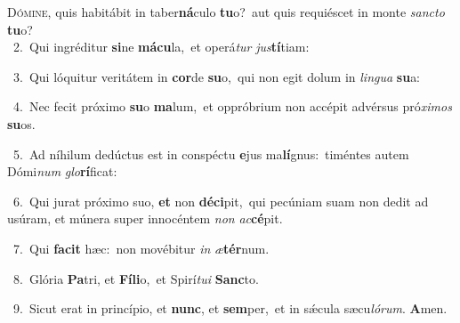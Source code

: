 \lettrine{\initial\textcolor{\initialcolor}{D}}{ómine,} quis habitábit in taber\-\textbf{ná}\-culo \textbf{tu}\-o?~\star aut quis requiéscet in monte \textit{sanc}\-\textit{to} \textbf{tu}\-o?\\
{\numbfont\textcolor{\numbcolor}{~2.}}~Qui ingréditur \textbf{si}\-ne \textbf{má}\-\textbf{cu}la,~\star et operá\textit{tur} \textit{jus}\-\textbf{tí}tiam:\par
{\numbfont\textcolor{\numbcolor}{~3.}}~Qui lóquitur veritátem in \textbf{cor}\-de \textbf{su}\-o,~\star qui non egit dolum in \textit{lin}\-\textit{gua} \textbf{su}\-a:\par
{\numbfont\textcolor{\numbcolor}{~4.}}~Nec fecit próximo \textbf{su}\-o \textbf{ma}\-lum,~\star et oppróbrium non accépit advérsus pró\-\textit{xi}\-\textit{mos} \textbf{su}\-os.\par
{\numbfont\textcolor{\numbcolor}{~5.}}~Ad níhilum dedúctus est in conspéctu \textbf{e}\-jus ma\-\textbf{lí}\-gnus:~\star timéntes autem Dómi\textit{num} \textit{glo}\-\textbf{rí}ficat:\par
{\numbfont\textcolor{\numbcolor}{~6.}}~Qui jurat próximo suo, \textbf{et} non \textbf{dé}\-\textbf{ci}pit,~\star qui pecúniam suam non dedit ad usúram, et múnera super innocéntem \textit{non} \textit{ac}\-\textbf{cé}pit.\par
{\numbfont\textcolor{\numbcolor}{~7.}}~Qui \textbf{fa}\-\textbf{cit} hæc:~\star non movébitur \textit{in} \textit{æ}\-\textbf{tér}num.\par
{\numbfont\textcolor{\numbcolor}{~8.}}~Glória \textbf{Pa}\-tri, et \textbf{Fí}\-\textbf{li}o,~\star et Spirí\-\textit{tu}\-\textit{i} \textbf{Sanc}\-to.\par
{\numbfont\textcolor{\numbcolor}{~9.}}~Sicut erat in princípio, et \textbf{nunc}\-, et \textbf{sem}\-per,~\star et in sǽcula sæcu\-\textit{ló}\-\textit{rum}. \textbf{A}\-men.\par
